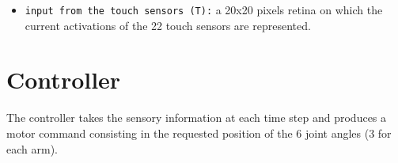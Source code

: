 \documentclass[11pt]{article}
\begin{document}
\begin{itemize}
\begin{itemize}

%

            \item \texttt{input from the touch sensors (T):} a 20x20 pixels retina on which the current
                activations of the 22 touch sensors are represented.

%
%
%
%
%
%

        \end{itemize}

\end{itemize}



\section{Controller} 
\label{sec:controller}

The controller takes the sensory information at each time step and produces a motor command consisting in the requested
position of the 6 joint angles (3 for each arm).
\end{document}
